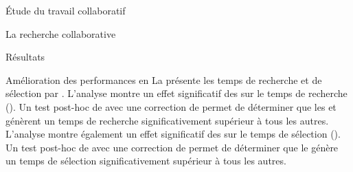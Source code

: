 \documentclass[myfrancais]{mythesis}
\begin{document}
\begin{mypart}{Étude du travail collaboratif}
\begin{mychapter}{La recherche collaborative}
\begin{mysection}{Résultats}
\begin{mysubsection}{Amélioration des performances en }
					La  présente les temps de recherche et de sélection par  .
					L'analyse montre un effet significatif des  sur le temps de recherche ().
					Un test post-hoc de  avec une correction de  permet de déterminer que les   et  génèrent un temps de recherche significativement supérieur à tous les autres.
					L'analyse montre également un effet significatif des  sur le temps de sélection ().
					Un test post-hoc de  avec une correction de  permet de déterminer que le   génère un temps de sélection significativement supérieur à tous les autres.


\end{mysubsection}
\end{mysection}
\end{mychapter}
\end{mypart}
\end{document}
